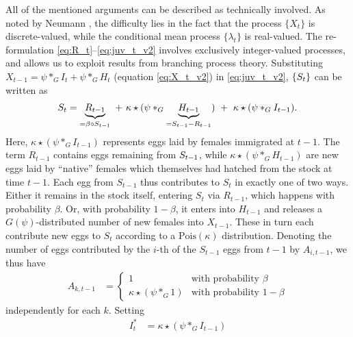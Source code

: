 \documentclass{article}
\begin{document}
All of the mentioned arguments can be described as technically involved. As noted by Neumann \cite{Neumann2011}, the difficulty lies in the fact that the process $\{X_t\}$ is discrete-valued, while the conditional mean process $\{\lambda_t\}$ is real-valued. The re-formulation \eqref{eq:R_t}--\eqref{eq:juv_t_v2} involves exclusively integer-valued processes, and allows us to exploit results from branching process theory. Substituting $X_{t - 1} = \psi *_G I_t + \psi *_G H_t$ (equation \eqref{eq:X_t_v2}) in \eqref{eq:juv_t_v2}, $\{S_t\}$ can be written as
\begin{align}
S_t = \underbrace{R_{t - 1}}_{= \beta \circ S_{t - 1}} \ + \ \kappa \star (\psi *_G \underbrace{H_{t - 1}}_{ = S_{t - 1} - R_{t - 1}}) \ + \ \kappa \star (\psi *_G I_{t - 1}). \label{eq:recursion_S}
\end{align}
Here, $\kappa \star (\psi *_G I_{t - 1})$ represents eggs laid by females immigrated at $t - 1$. The term  $R_{t - 1}$ contains eggs remaining from $ S_{t - 1}$, while $\kappa \star (\psi *_G H_{t - 1})$ are new eggs laid by ``native'' females which themselves had hatched from the stock at time $t - 1$. Each egg from $S_{t - 1}$ thus contributes to $S_t$ in exactly one of two ways. Either it remains in the stock itself, entering $S_t$ via $R_{t - 1}$, which happens with probability $\beta$. Or, with probability $1 - \beta$, it enters into $H_{t - 1}$ and releases a $G(\psi)$-distributed number of new females into $X_{t - 1}$. These in turn each contribute new eggs to $S_t$ according to a $\text{Pois}(\kappa)$ distribution. Denoting the number of eggs contributed by the $i$-th of the $S_{t - 1}$ eggs from $t - 1$ by $A_{i, t - 1}$, we thus have
\begin{align}
A_{k, t - 1} & = \begin{cases}
1 & \text{with probability } \beta\\ %
\kappa \star (\psi *_G 1) & \text{with probability } 1 - \beta %
\label{eq:Z_t_i}
\end{cases}
\end{align}
independently for each $k$. Setting
\begin{align}
I^*_t & = \kappa\star (\psi *_G I_{t - 1}) \label{eq:I_star}
\end{align}
\end{document}
